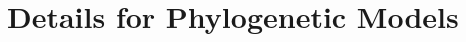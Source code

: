 \documentclass[11pt,a4paper]{article}
\begin{document}
\section{Details for Phylogenetic Models}















\end{document}
